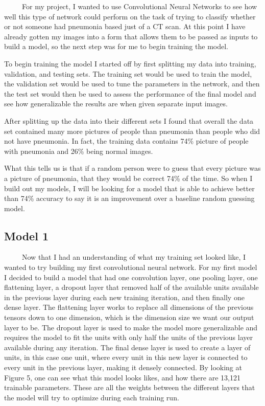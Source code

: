 \documentclass[12pt]{article}
\begin{document}
~~~~~For my project, I wanted to use Convolutional Neural Networks to
see how well this type of network could perform on the task of trying to
classify whether or not someone had pneumonia based just of a CT scan.
At this point I have already gotten my images into a form that allows
them to be passed as inputs to build a model, so the next step was for
me to begin training the model.

To begin training the model I started off by first splitting my data
into training, validation, and testing sets. The training set would be
used to train the model, the validation set would be used to tune the
parameters in the network, and then the test set would then be used to
assess the performance of the final model and see how generalizable the
results are when given separate input images.

After splitting up the data into their different sets I found that
overall the data set contained many more pictures of people than
pneumonia than people who did not have pneumonia. In fact, the training
data contains 74\% picture of people with pneumonia and 26\% being
normal images.

What this tells us is that if a random person were to guess that every
picture was a picture of pneumonia, that they would be correct 74\% of
the time. So when I build out my models, I will be looking for a model
that is able to achieve better than 74\% accuracy to say it is an
improvement over a baseline random guessing model.

\hypertarget{model-1}{%
\subsection{Model 1}\label{model-1}}

~~~~~Now that I had an understanding of what my training set looked
like, I wanted to try building my first convolutional neural network.
For my first model I decided to build a model that had one convolution
layer, one pooling layer, one flattening layer, a dropout layer that
removed half of the available units available in the previous layer
during each new training iteration, and then finally one dense layer.
The flattening layer works to replace all dimensions of the previous
tensors down to one dimension, which is the dimension size we want our
output layer to be. The dropout layer is used to make the model more
generalizable and requires the model to fit the units with only half the
units of the previous layer available during any iteration. The final
dense layer is used to create a layer of units, in this case one unit,
where every unit in this new layer is connected to every unit in the
previous layer, making it densely connected. By looking at Figure 5, one
can see what this model looks likes, and how there are 13,121 trainable
parameters. These are all the weights between the different layers that
the model will try to optimize during each training run.
\end{document}
